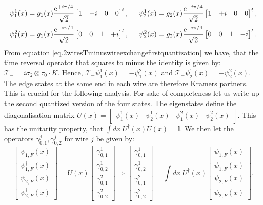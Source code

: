 \begin{align}
\psi^1_1(x) &= g_1(x)\frac{\text{e}^{+i\pi/4}}{\sqrt{2}}\begin{bmatrix} 1 & -i & 0 & 0 \end{bmatrix}^t , \hspace{0.5cm} \psi^1_2(x) = g_2(x)\frac{\text{e}^{-i\pi/4}}{\sqrt{2}}\begin{bmatrix} 1 & +i & 0 & 0 \end{bmatrix}^t, \nonumber \\
\psi^2_1(x) &= g_1(x)\frac{\text{e}^{-i\pi/4}}{\sqrt{2}}\begin{bmatrix} 0 & 0 & 1 & +i \end{bmatrix}^t , \hspace{0.5cm} \psi^2_2(x) = g_2(x)\frac{\text{e}^{+i\pi/4}}{\sqrt{2}}\begin{bmatrix} 0 & 0 & 1 & -i \end{bmatrix}^t.
\end{align}
From equation \eqref{eq.2wiresTminuswireexchangefirstquantization} we have, that the time reversal operator that squares to minus the identity is given by: $\mathcal{T}_- = i\sigma_2\otimes\tau_0 \cdot K$. Hence, $\mathcal{T}_-\psi^1_1(x) = -\psi^2_1(x)$ and $\mathcal{T}_-\psi^1_2(x) = -\psi^2_2(x)$. The edge states at the same end in each wire are therefore Kramers partners. This is crucial for the following analysis. For sake of completeness let us write up the second quantized version of the four states. The eigenstates define the diagonalisation matrix $U(x) = \begin{bmatrix} \psi^{1}_{1}(x) & \psi^{1}_{2}(x) & \psi^{2}_{1}(x) & \psi^{2}_{2}(x) \end{bmatrix}$. This has the unitarity property, that $\int dx \; U^\dagger(x) U(x) = \mathbb{I}$. We then let the operators $\gamma^{j}_{0,1}, \gamma^{j}_{0,2}$ for wire $j$ be given by:
\begin{equation}
\begin{bmatrix} \psi_{1,F}(x) \\ \psi_{1,F}^\dagger(x) \\ \psi_{2,F}(x) \\ \psi_{2,F}^\dagger(x) \end{bmatrix} = U(x) \begin{bmatrix} \gamma^{1}_{0,1} \\ \gamma^{1}_{0,2} \\ \gamma^{2}_{0,1} \\ \gamma^{2}_{0,2} \end{bmatrix} \Rightarrow \begin{bmatrix} \gamma^{1}_{0,1} \\ \gamma^{1}_{0,2} \\ \gamma^{2}_{0,1} \\ \gamma^{2}_{0,2} \end{bmatrix} = \int dx \; U^\dagger(x) \begin{bmatrix} \psi_{1,F}(x) \\ \psi_{1,F}^\dagger(x) \\ \psi_{2,F}(x) \\ \psi_{2,F}^\dagger(x) \end{bmatrix}.
\label{eq.Majoranaedgemodedef} 
\end{equation} 
